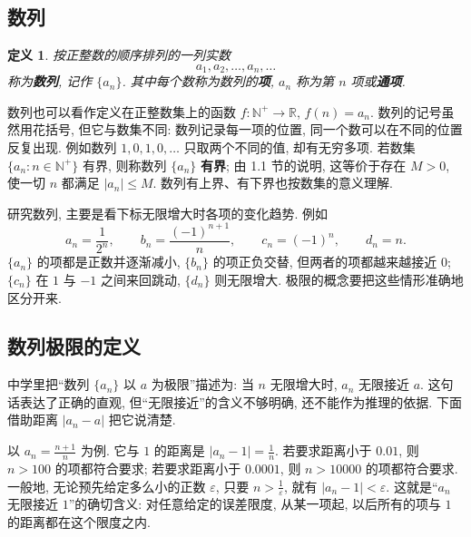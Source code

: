 \documentclass[UTF8,openany]{ctexbook}
\theoremstyle{chinesetextbook}
\newtheorem{definition}{定义}[section]
\begin{document}
\subsection{数列}
\begin{definition}
按正整数的顺序排列的一列实数
\[
a_1,a_2,\ldots,a_n,\ldots
\]
称为\textbf{数列}, 记作 $\{a_n\}$. 其中每个数称为数列的\textbf{项}, $a_n$ 称为第 $n$ 项或\textbf{通项}.
\end{definition}
数列也可以看作定义在正整数集上的函数 $f:\mathbb N^+\to\mathbb R$, $f(n)=a_n$. 数列的记号虽然用花括号, 但它与数集不同: 数列记录每一项的位置, 同一个数可以在不同的位置反复出现. 例如数列 $1,0,1,0,\ldots$ 只取两个不同的值, 却有无穷多项. 若数集 $\{a_n:n\in\mathbb N^+\}$ 有界, 则称数列 $\{a_n\}$ \textbf{有界}; 由 1.1 节的说明, 这等价于存在 $M>0$, 使一切 $n$ 都满足 $|a_n|\le M$. 数列有上界、有下界也按数集的意义理解.

研究数列, 主要是看下标无限增大时各项的变化趋势. 例如
\[
a_n=\frac1{2^n},\qquad b_n=\frac{(-1)^{n+1}}n,\qquad c_n=(-1)^n,\qquad d_n=n.
\]
$\{a_n\}$ 的项都是正数并逐渐减小, $\{b_n\}$ 的项正负交替, 但两者的项都越来越接近 $0$; $\{c_n\}$ 在 $1$ 与 $-1$ 之间来回跳动, $\{d_n\}$ 则无限增大. 极限的概念要把这些情形准确地区分开来.
\subsection{数列极限的定义}
中学里把“数列 $\{a_n\}$ 以 $a$ 为极限”描述为: 当 $n$ 无限增大时, $a_n$ 无限接近 $a$. 这句话表达了正确的直观, 但“无限接近”的含义不够明确, 还不能作为推理的依据. 下面借助距离 $|a_n-a|$ 把它说清楚.

以 $\displaystyle a_n=\frac{n+1}n$ 为例. 它与 $1$ 的距离是 $\displaystyle|a_n-1|=\frac1n$. 若要求距离小于 $0.01$, 则 $n>100$ 的项都符合要求; 若要求距离小于 $0.0001$, 则 $n>10000$ 的项都符合要求. 一般地, 无论预先给定多么小的正数 $\varepsilon$, 只要 $\displaystyle n>\frac1\varepsilon$, 就有 $|a_n-1|<\varepsilon$. 这就是“$a_n$ 无限接近 $1$”的确切含义: 对任意给定的误差限度, 从某一项起, 以后所有的项与 $1$ 的距离都在这个限度之内.
\end{document}
